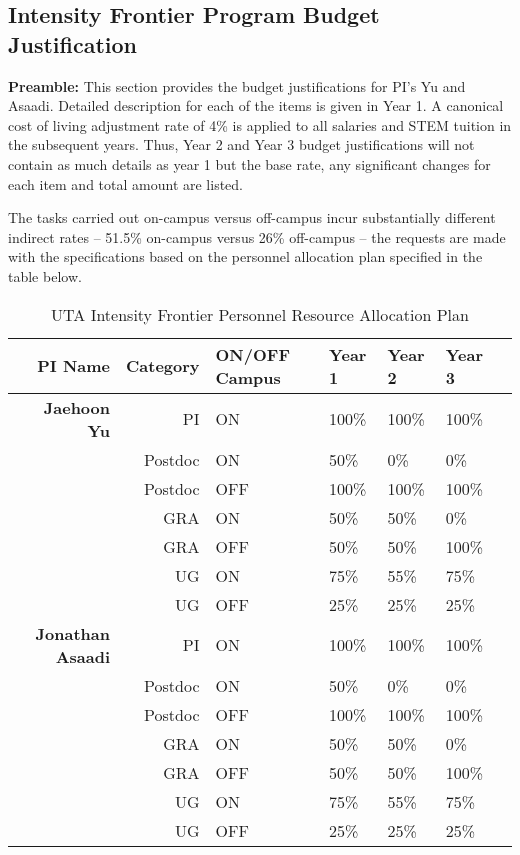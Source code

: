 \subsection{\Large Intensity Frontier Program Budget Justification}
{\bf Preamble:} This section provides the budget justifications for PI’s Yu and Asaadi.  Detailed description for each of the items is given in Year 1.  A canonical cost of living adjustment rate of 4\% is applied to all salaries and STEM tuition in the subsequent years.   Thus, Year 2 and Year 3 budget justifications will not contain as much details as year 1 but the base rate, any significant changes for each item and total amount are listed.

The tasks carried out on-campus versus off-campus incur substantially different indirect rates – 51.5\% on-campus versus 26\% off-campus – the requests are made with the specifications based on the personnel allocation plan specified in the table below.  
\begin{table}[htb]
\centering
\begin{tabular}{ || r || r |  p{1.7cm} | p{1.7cm} | p{1.7cm} || p{1.7cm} | p{1.8cm} || }
\hline\hline\hline
\textbf{PI Name} & \textbf{Category} & \textbf{ON/OFF Campus} & \textbf{Year 1} & \textbf{Year 2} & \textbf{Year 3} \\ \hline\hline
\textbf{Jaehoon Yu}& PI & ON & 100\% & 100\% & 100\% \\ \hline
                                   & Postdoc & ON & 50\% & 0\% & 0\% \\ \hline
                                   & Postdoc & OFF & 100\% & 100\% & 100\% \\ \hline
                                   & GRA & ON & 50\% & 50\% & 0\% \\ \hline
                                   & GRA & OFF & 50\% & 50\% & 100\% \\ \hline
                                   & UG & ON & 75\% & 55\% & 75\% \\ \hline
                                   & UG & OFF & 25\% & 25\% & 25\% \\ \hline\hline

\textbf{Jonathan Asaadi}& PI & ON & 100\% & 100\% & 100\% \\ \hline
                                   & Postdoc & ON & 50\% & 0\% & 0\% \\ \hline
                                   & Postdoc & OFF & 100\% & 100\% & 100\% \\ \hline
                                   & GRA & ON & 50\% & 50\% & 0\% \\ \hline
                                   & GRA & OFF & 50\% & 50\% & 100\% \\ \hline
                                   & UG & ON & 75\% & 55\% & 75\% \\ \hline
                                   & UG & OFF & 25\% & 25\% & 25\% \\ \hline\hline\hline
\end{tabular}
\caption{UTA Intensity Frontier Personnel Resource Allocation Plan}
\end{table}
%

